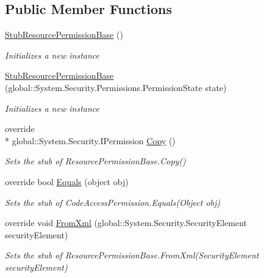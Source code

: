 \subsection*{Public Member Functions}
\begin{DoxyCompactItemize}
\item 
\hyperlink{class_system_1_1_security_1_1_permissions_1_1_fakes_1_1_stub_resource_permission_base_a6439e4f58ae5af3d55485f68060cfe68}{Stub\-Resource\-Permission\-Base} ()
\begin{DoxyCompactList}\small\item\em Initializes a new instance\end{DoxyCompactList}\item 
\hyperlink{class_system_1_1_security_1_1_permissions_1_1_fakes_1_1_stub_resource_permission_base_a4977f20b708e3e33476f2be0e24c79fa}{Stub\-Resource\-Permission\-Base} (global\-::\-System.\-Security.\-Permissions.\-Permission\-State state)
\begin{DoxyCompactList}\small\item\em Initializes a new instance\end{DoxyCompactList}\item 
override \\*
global\-::\-System.\-Security.\-I\-Permission \hyperlink{class_system_1_1_security_1_1_permissions_1_1_fakes_1_1_stub_resource_permission_base_aa9fdaf5d9733bf6e1e92f2b93e8d8e4d}{Copy} ()
\begin{DoxyCompactList}\small\item\em Sets the stub of Resource\-Permission\-Base.\-Copy()\end{DoxyCompactList}\item 
override bool \hyperlink{class_system_1_1_security_1_1_permissions_1_1_fakes_1_1_stub_resource_permission_base_a5beba277862c10f0ffda7e217777773b}{Equals} (object obj)
\begin{DoxyCompactList}\small\item\em Sets the stub of Code\-Access\-Permission.\-Equals(\-Object obj)\end{DoxyCompactList}\item 
override void \hyperlink{class_system_1_1_security_1_1_permissions_1_1_fakes_1_1_stub_resource_permission_base_aa8c51b16e42e25f101cde207202e843a}{From\-Xml} (global\-::\-System.\-Security.\-Security\-Element security\-Element)
\begin{DoxyCompactList}\small\item\em Sets the stub of Resource\-Permission\-Base.\-From\-Xml(\-Security\-Element security\-Element)\end{DoxyCompactList}\item 

\end{DoxyCompactItemize}
